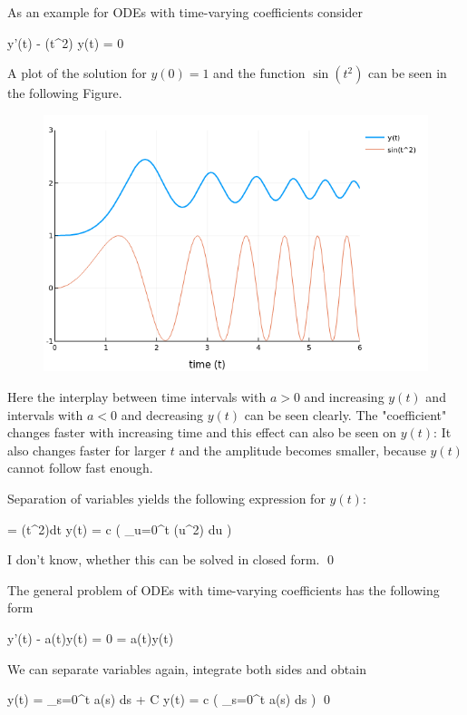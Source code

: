 As an example for ODEs with time-varying coefficients consider

\bee
y'(t) - \sin(t^2) y(t) = 0
\eee

A plot of the solution for $y(0) = 1$ and the function $\sin(t^2)$ can be seen in the following Figure.

\begin{figure}[H]
	\includegraphics[scale=0.5]{images/ode_01_05.png}
\end{figure}

Here the interplay between time intervals with $a>0$ and increasing $y(t)$ and intervals with $a<0$ and decreasing $y(t)$ can be seen clearly. The "coefficient" changes faster with increasing time and this effect can also be seen on $y(t)$: It also changes faster for larger $t$ and the amplitude becomes smaller, because $y(t)$ cannot follow fast enough.

Separation of variables yields the following expression for $y(t)$:

\bee
{} = \sin(t^2)dt \rightarrow y(t) = c \exp \left( \int_{u=0}^t \sin(u^2) du \right)
\eee

I don't know, whether this can be solved in closed form. \qed


The general problem of ODEs with time-varying coefficients has the following form

\bee
y'(t) - a(t)y(t) = 0 \rightarrow {} = a(t)y(t)
\eee

We can separate variables again, integrate both sides and obtain

\bee
\ln y(t) = \int_{s=0}^t a(s) ds + C \rightarrow y(t) = c \exp \left( \int_{s=0}^t a(s) ds \right) \qed
\eee
